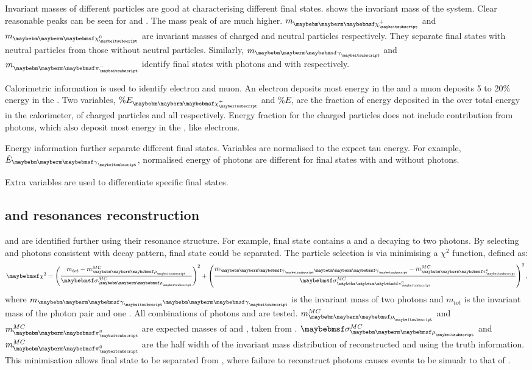 Invariant masses of different particles are good at characterising different final states.  shows the invariant mass of the system. Clear reasonable peaks can be seen for \Prho and \Pai. The mass peak of  \decayAiPionFinalStateShort are much higher. $m_{\charge}$ and $m_{\neutral}$ are invariant masses of charged and neutral particles respectively. They separate final states with neutral particles from those without neutral particles. Similarly, $m_{\Pgg}$ and $m_{\Pgpm}$ identify final states with photons and with \Pgpm respectively.

Calorimetric information is used to identify electron and muon. An electron deposits most energy in the \ECAL and a muon deposits 5 to 20\% energy in the \ECAL. Two variables, $\% E_{\charge}$ and $\% E$, are the fraction of energy deposited in the \ECAL over total energy in the calorimeter, of charged particles and all \PFOs respectively. Energy fraction for the charged particles does not include contribution from photons, which also deposit most energy in the \ECAL, like electrons.

Energy information further separate different final states. Variables are normalised to the expect tau energy. For example, $\tilde{E}_{\Pgg}$, normalised energy of photons are different for final states with and without photons.

Extra variables are used to differentiate specific final states.

\subsection{\texorpdfstring{\decayRhoShort and \decayRhoShort} \, resonances reconstruction}
\label{sec:tauResonance}
\decayRhoShort and \decayAiPhotonShort are identified further using their resonance structure. For example, \decayRhoShort final state contains a \Pgpm and a \Ppizero decaying to two photons. By selecting \Pgpm and photons consistent with \Prho decay pattern, \decayRhoShort final state could be separated. The particle selection is via minimising a  $\chi^{2}$ function, defined as:
\begin{equation}
\chi^{2} = {\left(\frac{m_{tot} -  m^{MC}_{\Prho}}{\sigma^{MC}_{\Prho}}\right)}^{2} + {\left(\frac{m_{\Pphoton \Pphoton} -  m^{MC}_{\Ppizero}}{\sigma^{MC}_{\Ppizero}}\right)}^{2} \,,
\end{equation}
where $m_{\Pphoton \Pphoton}$ is the invariant mass of two photons and $m_{tot}$ is the invariant mass of the  photon pair and one \Pgpm. All combinations of photons and \Pgpm are tested. $m^{MC}_{\Prho}$ and $m^{MC}_{\Ppizero}$ are expected masses of \Prho and \Ppizero, taken from \cite{Agashe:2014kda}. $\sigma^{MC}_{\Prho}$ and $m^{MC}_{\Ppizero}$ are the half width of the invariant mass distribution of reconstructed \Prho and \Ppizero using the truth information. This minimisation allows \decayRhoShort final state to be separated from \decayAiPhotonShort, where failure to reconstruct photons causes  \decayAiPhotonShort events to be simualr to that of \decayRhoShort.

